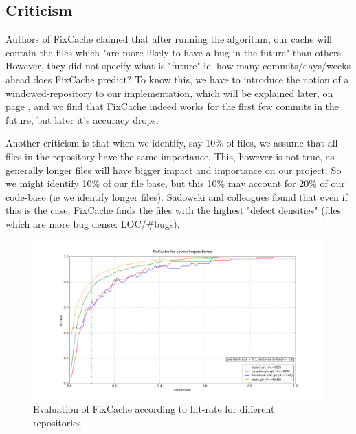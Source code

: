 \documentclass[12pt,twoside,notitlepage]{report}
\newcommand{\fxch}{FixCache }
\begin{document}
\subsection{Criticism}
Authors of \fxch claimed that after running the algorithm, our cache will contain the files which "are more likely to have a bug in the future" than others. However, they did not specify what is "future" ie. how many commits/days/weeks ahead does \fxch predict? To know this, we have to introduce the notion of a windowed-repository to our implementation, which will be explained later, on page \pageref{windowedrep}, and we find that \fxch indeed works for the first few commits in the future, but later it's accuracy drops.

Another criticism is that when we identify, say 10\% of files, we assume that all files in the repository have the same importance. This, however is not true, as generally longer files will have bigger impact and importance on our project. So we might identify 10\% of our file base, but this 10\% may account for 20\% of our code-base (ie we identify longer files). Sadowski and colleagues \cite{Bugcache} found that even if this is the case, \fxch finds the files with the highest "defect densities" (files which are more bug dense: LOC/\#bugs).
\clearpage
\begin{figure}[t!]
\includegraphics[width=1.0\textwidth]{figure_3.png}
\caption{Evaluation of \fxch according to hit-rate for different repositories}
\label{fig:v5_repos}
\end{figure}
\end{document}
